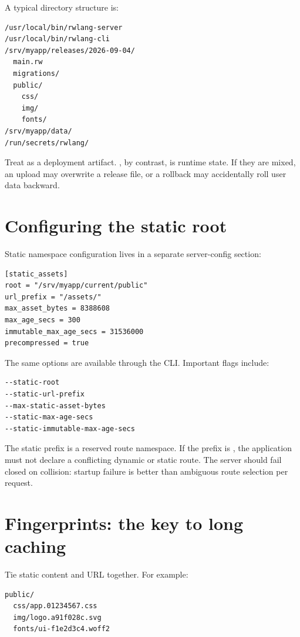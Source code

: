 A typical directory structure is:

\begin{lstlisting}
/usr/local/bin/rwlang-server
/usr/local/bin/rwlang-cli
/srv/myapp/releases/2026-09-04/
  main.rw
  migrations/
  public/
    css/
    img/
    fonts/
/srv/myapp/data/
/run/secrets/rwlang/
\end{lstlisting}

Treat  as a deployment artifact. , by contrast, is runtime state. If they are mixed, an upload may overwrite a release file, or a rollback may accidentally roll user data backward.

\section{Configuring the static root}

Static namespace configuration lives in a separate server-config section:

\begin{lstlisting}
[static_assets]
root = "/srv/myapp/current/public"
url_prefix = "/assets/"
max_asset_bytes = 8388608
max_age_secs = 300
immutable_max_age_secs = 31536000
precompressed = true
\end{lstlisting}

The same options are available through the CLI. Important flags include:

\begin{lstlisting}
--static-root
--static-url-prefix
--max-static-asset-bytes
--static-max-age-secs
--static-immutable-max-age-secs
\end{lstlisting}

The static prefix is a reserved route namespace. If the prefix is , the application must not declare a conflicting dynamic or static route. The server should fail closed on collision: startup failure is better than ambiguous route selection per request.

\section{Fingerprints: the key to long caching}

Tie static content and URL together. For example:

\begin{lstlisting}
public/
  css/app.01234567.css
  img/logo.a91f028c.svg
  fonts/ui-f1e2d3c4.woff2
\end{lstlisting}

